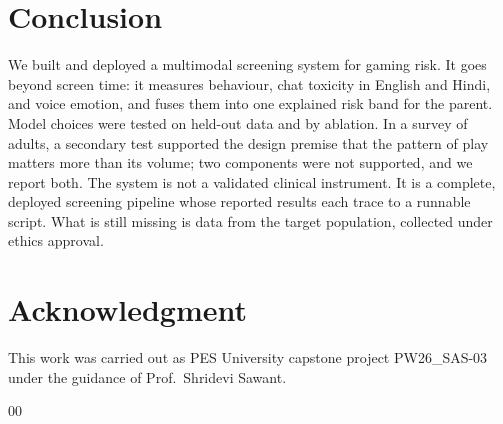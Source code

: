 \documentclass[conference]{IEEEtran}
\begin{document}
\section{Conclusion}
We built and deployed a multimodal screening system for gaming risk. It goes beyond
screen time: it measures behaviour, chat toxicity in English and Hindi, and voice
emotion, and fuses them into one explained risk band for the parent. Model choices were
tested on held-out data and by ablation. In a survey of adults, a secondary test
supported the design premise that the pattern of play matters more than its volume; two
components were not supported, and we report both. The system is not a validated
clinical instrument. It is a complete, deployed screening pipeline whose reported
results each trace to a runnable script. What is still missing is data from the target
population, collected under ethics approval.

\ifanon\else
\section*{Acknowledgment}
This work was carried out as PES University capstone project PW26\_SAS-03 under the
guidance of Prof.\ Shridevi Sawant.
\fi

\begin{thebibliography}{00}

\end{thebibliography}
\end{document}
